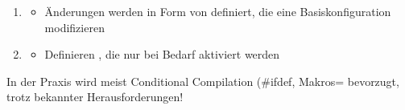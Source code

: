 \begin{infoBox}[title=Methoden zur SPLE-Implementierung]
\begin{enumerate}
\begin{enumerate}
            \begin{itemize}
                \item Feature-basierte Modularisierung durch explizite Feature-Module
            \end{itemize}
            \item {}
            \begin{itemize}
                \item Änderungen werden in Form von  definiert, die eine Basiskonfiguration modifizieren
            \end{itemize}
            \item {}
            \begin{itemize}
                \item Definieren , die nur bei Bedarf aktiviert werden
            \end{itemize}
        \end{enumerate}
        In der Praxis wird meist Conditional Compilation (\#ifdef, Makros= bevorzugt, trotz bekannter Herausforderungen!
    \end{enumerate}
\end{infoBox}
